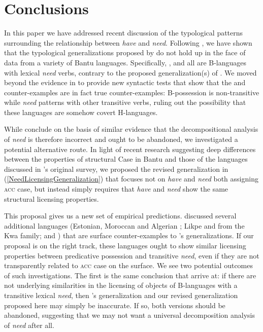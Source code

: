 \documentclass[output=paper,
modfonts
]{langscibook}
\begin{document}
\section{Conclusions} \label{Conclude}
\largerpage[2]
In this paper we have addressed recent discussion of the typological patterns surrounding the relationship between {\it have} and {\it need}.  Following \citet{Antonov:2014}, we have  shown that the typological generalizations
proposed by \citet{Harves:2012} do not hold up in the face of data
from a variety of Bantu languages. Specifically, ,  and  all are
B-languages with lexical {\it need} verbs, contrary to the proposed
generalization(s) of \citet{Harves:2012}.  We moved beyond the evidence in \citet{Antonov:2014}  to provide new syntactic tests that show that the  and  counter-examples 
are in fact true counter-examples: B-possession is non-transitive while {\it need} patterns with
other transitive verbs, ruling out the possibility that  these languages are somehow covert
H-languages. 

While \citet{Antonov:2014} conclude on the basis of similar evidence  that the \citet{Harves:2012} decompositional analysis of {\it need} is
therefore incorrect and ought to be abandoned, %
we investigated a
potential alternative route. In light of recent research suggesting
deep differences between the properties of structural
Case in Bantu and those of the languages discussed in \citet{Harves:2012}'s original
survey, %
we proposed the revised
generalization in (\ref{NeedLicensingGeneralization}) that focuses not
on {\it have} and {\it need} both assigning \textsc{acc} case,  but instead
simply requires that {\it have} and {\it need} show the same
structural licensing properties. 

This proposal gives  us a new set of empirical predictions. \citet{Antonov:2014}
 discussed several additional languages
(Estonian, Moroccan and Algerian ; Likpe and  from the Kwa
family; and  ) that are surface counter-examples to
\citet{Harves:2012}'s generalizations.  If our proposal is on the right track, these languages ought to show similar licensing properties
between predicative possession and transitive {\it need}, even if they
are not transparently related to \textsc{acc} case on the surface. We see two
potential outcomes of such investigations. The first is the same
conclusion that \citet{Antonov:2014} arrive at: if there are not
underlying similarities in the licensing of objects of B-languages
with a transitive lexical {\it need}, then \citet{Harves:2012}'s generalization and our revised
generalization proposed here may simply be inaccurate.  If so,  both versions
should be abandoned, suggesting that we may not want a universal decomposition analysis of {\it need} after all. 
\end{document}
